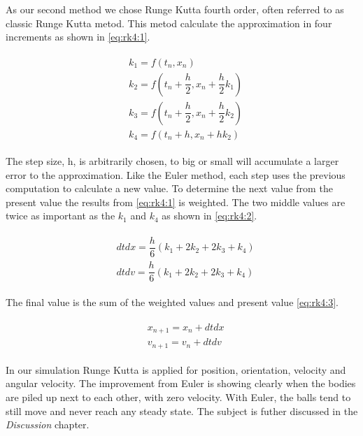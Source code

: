 \documentclass[a4paper,12pt]{report}
\begin{document}
As our second method we chose Runge Kutta fourth order, often referred to as classic Runge Kutta metod. This metod calculate the approximation in four increments as shown in \ref{eq:rk4:1}.

\begin{equation}
\begin{split}
\begin{aligned}
& k_{1} = f(t_{n}, x_{n}) \\
& k_{2} = f(t_{n}+\dfrac{h}{2}, x_{n}+\dfrac{h}{2}k_{1}) \\
& k_{3} = f(t_{n}+\dfrac{h}{2}, x_{n}+\dfrac{h}{2}k_{2}) \\
& k_{4} = f(t_{n}+h, x_{n}+hk_{2})
\end{aligned}
\end{split}
\label{eq:rk4:1}
\end{equation}

The step size, h, is arbitrarily chosen, to big or small will accumulate a larger error to the approximation. Like the Euler method, each step uses the previous computation to calculate a new value. To determine the next value from the present value the results from \ref{eq:rk4:1} is weighted. The two middle values are twice as important as the $k_1$ and $k_4$ as shown in \ref{eq:rk4:2}.

\begin{equation}
\begin{split}
\begin{aligned}
& dtdx = \dfrac{h}{6}(k_{1}+2k_{2}+2k_{3}+k_{4}) \\
& dtdv = \dfrac{h}{6}(k_{1}+2k_{2}+2k_{3}+k_{4})
\end{aligned}
\end{split}
\label{eq:rk4:2}
\end{equation}

The final value is the sum of the weighted values and present value \ref{eq:rk4:3}.

\begin{equation}
\begin{split}
\begin{aligned}
& x_{n+1}=x_n+dtdx\\
& v_{n+1}=v_n+dtdv
\end{aligned}
\end{split}
\label{eq:rk4:3}
\end{equation}

In our simulation Runge Kutta is applied for position, orientation, velocity and angular velocity. The improvement from Euler is showing clearly when the bodies are piled up next to each other, with zero velocity. With Euler, the balls tend to still move and never reach any steady state. The subject is futher discussed in the \emph{Discussion} chapter.
\end{document}
